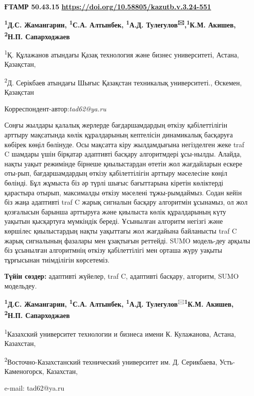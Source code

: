 \newpage
{\bfseries ҒТАМР 50.43.15}
\hfill {\bfseries \href{https://doi.org/10.58805/kazutb.v.3.24-551}{https://doi.org/10.58805/kazutb.v.3.24-551}}


\begin{center}

{\bfseries \textsuperscript{1}Д.С. Жамангарин, \textsuperscript{1}С.А.
Алтынбек, \textsuperscript{1}А.Д. Тулегулов\textsuperscript{🖂},\bfseries \textsuperscript{1}К.М. Акишев, \textsuperscript{2}Н.П.
Сапарходжаев}

\textsuperscript{1}Қ. Құлажанов атындағы Қазақ технология және бизнес
университеті, Астана, Қазақстан,

\textsuperscript{2}Д. Серікбаев атындағы Шығыс Қазақстан техникалық
университеті., Өскемен, Қазақстан
\end{center}
Корреспондент-автор:\emph{tad62@ya.ru}\vspace{0.5cm}

Соңғы жылдары қалалық жерлерде бағдаршамдардың өткізу қабілеттілігін
арттыру мақсатында көлік құралдарының кептелісін динамикалық басқаруға
көбірек көңіл бөлінуде. Осы мақсатта кіру жылдамдығына негізделген жеке
traf C шамдары үшін бірқатар адаптивті басқару алгоритмдері ұсы-нылды.
Алайда, нақты уақыт режимінде бірнеше қиылыстардан өтетін жол
жағдайларын ескере оты-рып, бағдаршамдардың өткізу қабілеттілігін арттыру
мәселесіне көңіл бөлінді. Бұл жұмыста біз әр түрлі шығыс бағыттарына
кіретін көліктерді қарастыра отырып, максималды өткізу мәселені
тұжы-рымдаймыз. Содан кейін біз жаңа адаптивті traf C жарық сигналын
басқару алгоритмін ұсынамыз, ол жол қозғалысын барынша арттыруға және
қиылыста көлік құралдарының күту уақытын қысқартуға мүмкіндік береді.
Ұсынылған алгоритм негізгі және көршілес қиылыстардың нақты уақыттағы
жол жағдайына байланысты traf C жарық сигналының фазалары мен ұзақтығын
реттейді. SUMO модель-деу арқылы біз ұсынылған алгоритмнің өткізу
қабілеттілігі мен орташа жүру уақыты тұрғысынан тиімділігін көрсетеміз.

{\bfseries Түйін сөздер:} адаптивті жүйелер, traf C, адаптивті басқару,
алгоритм, SUMO модельдеу.



\begin{center}
{\bfseries \textsuperscript{1}Д.С. Жамангарин, \textsuperscript{1}С.А.
Алтынбек, \textsuperscript{1}А.Д.
Тулегулов}\textsuperscript{🖂}{\bfseries \textsuperscript{1}К.М. Акишев, \textsuperscript{2}Н.П.
Сапарходжаев}

\textsuperscript{1}Казахский университет технологии и бизнеса имени К.
Кулажанова, Астана, Казахстан,

\textsuperscript{2}Восточно-Казахстанский технический университет им. Д.
Серикбаева, Усть-Каменогорск, Казахстан,

e-mail: tad62@ya.ru
\end{center}

